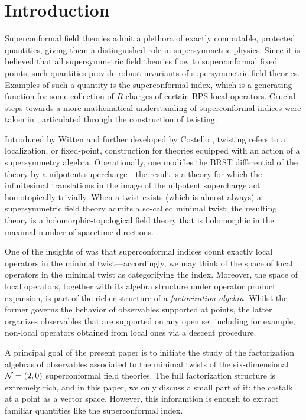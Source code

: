 %
%

%

\section{Introduction}
Superconformal field theories admit a plethora of exactly computable, protected quantities, giving them a distinguished role in supersymmetric physics. 
Since it is believed that all supersymmetric field theories flow to superconformal fixed points, such quantities provide robust invariants of supersymmetric field theories. 
Examples of such a quantity is the superconformal index, which is a generating function for some collection of $R$-charges of certain BPS local operators. 
Crucial steps towards a more mathematical understanding of superconformal indices were taken in \cite{SWchar}, articulated through the construction of twisting.

Introduced by Witten \cite{WittenTwist} and further developed by Costello \cite{CostelloHol}, twisting refers to a localization, or fixed-point, construction for theories equipped with an action of a supersymmetry algebra. 
Operationally, one modifies the BRST differential of the theory by a nilpotent supercharge---the result is a theory for which the infinitesimal translations in the image of the nilpotent supercharge act homotopically trivially. 
When a twist exists (which is almost always) a supersymmetric field theory admits a so-called minimal twist; the resulting theory is a holomorphic-topological field theory that is holomorphic in the maximal number of spacetime directions.

One of the insights of \cite{SWchar} was that superconformal indices count exactly local operators in the minimal twist---accordingly, we may think of the space of local operators in the minimal twist as categorifying the index.
Moreover, the space of local operators, together with its algebra structure under operator product expansion, is part of the richer structure of a \textit{factorization algebra}.
Whilst the former governs the behavior of observables supported at points, the latter organizes observables that are supported on any open set including for example, non-local operators obtained from local ones via a descent procedure.

A principal goal of the present paper is to initiate the study of the factorization algebras of observables associated to the minimal twists of the six-dimensional~$\mathcal N=(2,0)$ superconformal field theories. The full factorization structure is extremely rich, and in this paper, we only discuss a small part of it: the costalk at a point as a vector space. However, this inforamtion is enough to extract familiar quantities like the superconformal index.

